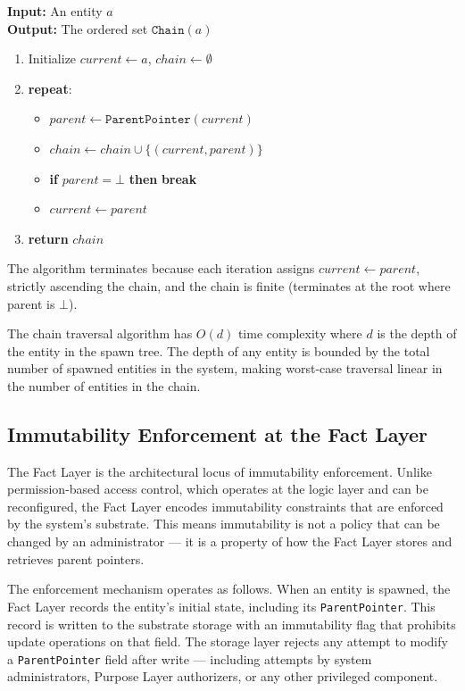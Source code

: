 \begin{algorithm}
\textbf{Input:} An entity $a$ \\[4pt]
\textbf{Output:} The ordered set $\texttt{Chain}(a)$

\begin{enumerate}
    \item Initialize $current \gets a$, $chain \gets \emptyset$
    \item \textbf{repeat}:
    \begin{itemize}
        \item $parent \gets \texttt{ParentPointer}(current)$
        \item $chain \gets chain \cup \{(current, parent)\}$
        \item \textbf{if} $parent = \bot$ \textbf{then} \textbf{break}
        \item $current \gets parent$
    \end{itemize}
    \item \textbf{return} $chain$
\end{enumerate}

The algorithm terminates because each iteration assigns $current \gets parent$, strictly ascending the chain, and the chain is finite (terminates at the root where parent is $\bot$).
\end{algorithm}

The chain traversal algorithm has $O(d)$ time complexity where $d$ is the depth of the entity in the spawn tree. The depth of any entity is bounded by the total number of spawned entities in the system, making worst-case traversal linear in the number of entities in the chain.

\subsection{Immutability Enforcement at the Fact Layer}

The Fact Layer is the architectural locus of immutability enforcement. Unlike permission-based access control, which operates at the logic layer and can be reconfigured, the Fact Layer encodes immutability constraints that are enforced by the system's substrate. This means immutability is not a policy that can be changed by an administrator — it is a property of how the Fact Layer stores and retrieves parent pointers.

The enforcement mechanism operates as follows. When an entity is spawned, the Fact Layer records the entity's initial state, including its \texttt{ParentPointer}. This record is written to the substrate storage with an immutability flag that prohibits update operations on that field. The storage layer rejects any attempt to modify a \texttt{ParentPointer} field after write — including attempts by system administrators, Purpose Layer authorizers, or any other privileged component.

